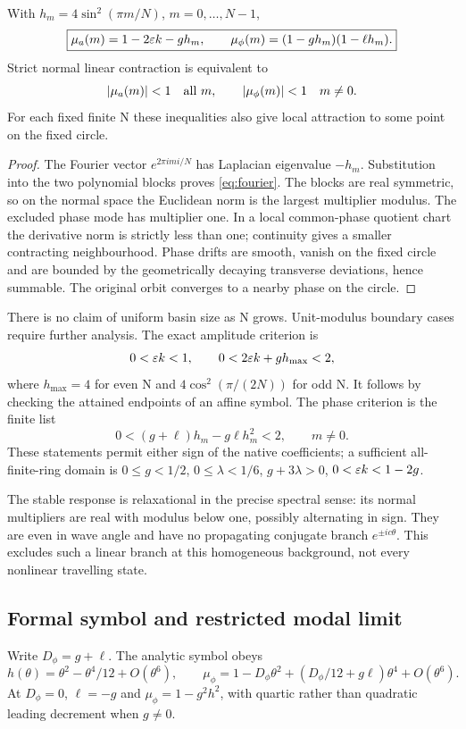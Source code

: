 \begin{theorem}\label{thm:fourier}
With \(h_m=4\sin^2(\pi m/N)\), \(m=0,\ldots,N-1\),
\begin{equation}
\boxed{\mu_a(m)=1-2\varepsilon k-gh_m,\qquad
\mu_\phi(m)=(1-gh_m)(1-\ell h_m).}\label{eq:fourier}
\end{equation}
Strict normal linear contraction is equivalent to
\begin{equation}
|\mu_a(m)|<1\quad\hbox{all }m,\qquad
|\mu_\phi(m)|<1\quad m\ne0.\label{eq:stable}
\end{equation}
For each fixed finite N these inequalities also give local attraction to some point on the fixed circle.
\end{theorem}
\begin{proof}
The Fourier vector \(e^{2\pi imi/N}\) has Laplacian eigenvalue \(-h_m\). Substitution into the two polynomial blocks proves \eqref{eq:fourier}. The blocks are real symmetric, so on the normal space the Euclidean norm is the largest multiplier modulus. The excluded phase mode has multiplier one. In a local common-phase quotient chart the derivative norm is strictly less than one; continuity gives a smaller contracting neighbourhood. Phase drifts are smooth, vanish on the fixed circle and are bounded by the geometrically decaying transverse deviations, hence summable. The original orbit converges to a nearby phase on the circle.
\end{proof}
There is no claim of uniform basin size as N grows. Unit-modulus boundary cases require further analysis. The exact amplitude criterion is
\[
0<\varepsilon k<1,\qquad 0<2\varepsilon k+g h_{\max}<2,
\]
where \(h_{\max}=4\) for even N and \(4\cos^2(\pi/(2N))\) for odd N. It follows by checking the attained endpoints of an affine symbol. The phase criterion is the finite list
\[
0<(g+\ell)h_m-g\ell h_m^2<2,\qquad m\ne0.
\]
These statements permit either sign of the native coefficients; a sufficient all-finite-ring domain is \(0\le g<1/2\), \(0\le\lambda<1/6\), \(g+3\lambda>0\), \(0<\varepsilon k<1-2g\).

The stable response is relaxational in the precise spectral sense: its normal multipliers are real with modulus below one, possibly alternating in sign. They are even in wave angle and have no propagating conjugate branch \(e^{\pm ic\theta}\). This excludes such a linear branch at this homogeneous background, not every nonlinear travelling state.

\subsection{Formal symbol and restricted modal limit}
Write \(D_\phi=g+\ell\). The analytic symbol obeys
\[
h(\theta)=\theta^2-\theta^4/12+O(\theta^6),\qquad
\mu_\phi=1-D_\phi\theta^2+(D_\phi/12+g\ell)\theta^4+O(\theta^6).
\]
At \(D_\phi=0\), \(\ell=-g\) and \(\mu_\phi=1-g^2h^2\), with quartic rather than quadratic leading decrement when \(g\ne0\).

